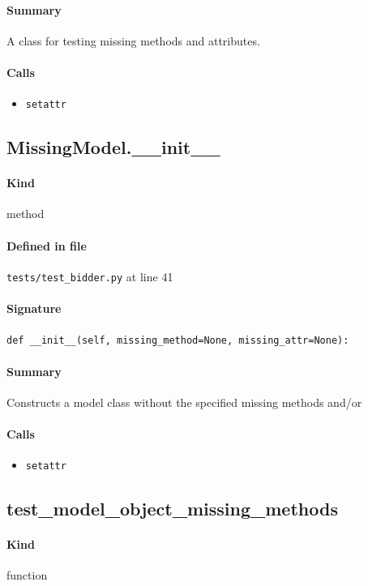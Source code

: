 \documentclass[11pt]{report}
\begin{document}
\paragraph{Summary} A class for testing missing methods and attributes.
\paragraph{Calls}
\begin{itemize}[leftmargin=*]
  \item \texttt{setattr}
\end{itemize}
\subsection{MissingModel.\_\_init\_\_}
\label{def:tests-test_bidder.py:MissingModel.__init__:L41}
\paragraph{Kind} method
\paragraph{Defined in file} \texttt{tests/test\_bidder.py} at line 41
\paragraph{Signature} \texttt{def \_\_init\_\_(self, missing\_method=None, missing\_attr=None):}
\paragraph{Summary} Constructs a model class without the specified missing methods and/or
\paragraph{Calls}
\begin{itemize}[leftmargin=*]
  \item \texttt{setattr}
\end{itemize}
\subsection{test\_model\_object\_missing\_methods}
\label{def:tests-test_bidder.py:test_model_object_missing_methods:L64}
\paragraph{Kind} function
\end{document}
